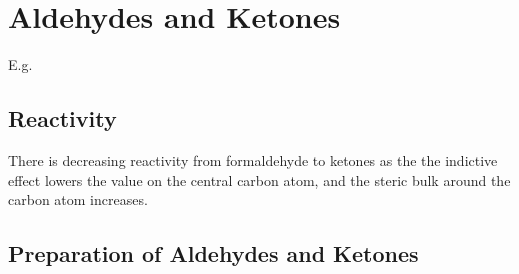 \section{Aldehydes and Ketones}

E.g.

\subsection{Reactivity}


There is decreasing reactivity from formaldehyde to ketones as the the indictive
effect lowers the \ce{\delta+} value on the central carbon atom, and the steric
bulk around the carbon atom increases.

\subsection{Preparation of Aldehydes and Ketones}

